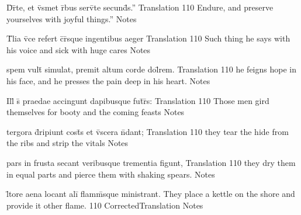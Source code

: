 \latline
  {D\={}r\={}te, et v\={}smet r\={}bus serv\={}te secund\={\macron {\i}}s.''}
  { Translation }
  {110}
  { Endure, and preserve yourselves with joyful things.'' }
  { Notes }


\latline
  {T\={}lia v\={}ce refert c\={}r\={\macron {\i}}sque ingentibus aeger}
  { Translation }
  {110}
  { Such thing he says with his voice and sick with huge cares  }
  { Notes }


\latline
  {spem vult\={} simulat, premit altum corde dol\={}rem.}
  { Translation }
  {110}
  { he feigns hope in his face, and he presses the pain deep in his heart. }
  { Notes }


\latline
  {Ill\={\macron {\i}} s\={} praedae accingunt dapibusque fut\={}r\={\macron {\i}}s:}
  { Translation }
  {110}
  { Those men gird themselves for booty and the coming feasts }
  { Notes }


\latline
  {tergora d\={\macron {\i}}ripiunt cost\={\macron {\i}}s et v\={\macron {\i}}scera n\={}dant;}
  { Translation }
  {110}
  { they tear the hide from the ribs and strip the vitals }
  { Notes }


\latline
  {pars in frusta secant veribusque trementia figunt,}
  { Translation }
  {110}
  { they dry them in equal parts and pierce them with shaking spears. }
  { Notes }


\latline
  {l\={\macron {\i}}tore aena locant ali\={\macron {\i}} flamm\={}sque ministrant.}
  { They place a kettle on the shore and provide it other flame. }
  {110}
  { CorrectedTranslation }
  { Notes }

